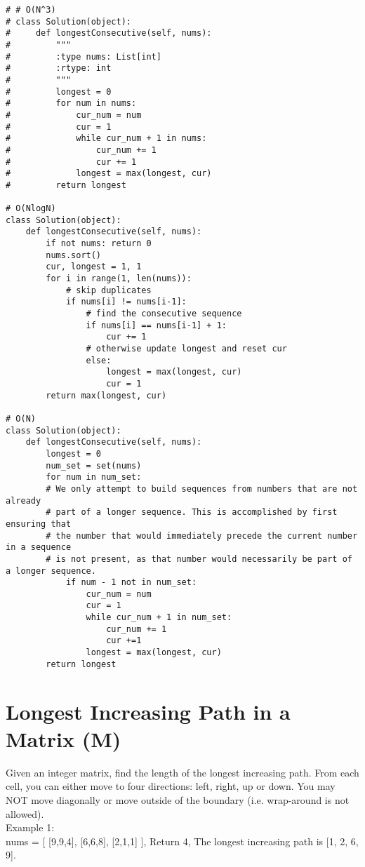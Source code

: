 \begin{lstlisting}
# # O(N^3)
# class Solution(object):
#     def longestConsecutive(self, nums):
#         """
#         :type nums: List[int]
#         :rtype: int
#         """
#         longest = 0
#         for num in nums:
#             cur_num = num
#             cur = 1
#             while cur_num + 1 in nums:
#                 cur_num += 1
#                 cur += 1
#             longest = max(longest, cur)
#         return longest
    
# O(NlogN)
class Solution(object):
    def longestConsecutive(self, nums):
        if not nums: return 0
        nums.sort()
        cur, longest = 1, 1
        for i in range(1, len(nums)):
            # skip duplicates
            if nums[i] != nums[i-1]:
                # find the consecutive sequence
                if nums[i] == nums[i-1] + 1:
                    cur += 1
                # otherwise update longest and reset cur
                else:
                    longest = max(longest, cur)
                    cur = 1
        return max(longest, cur)
           
# O(N)
class Solution(object):
    def longestConsecutive(self, nums):
        longest = 0
        num_set = set(nums)
        for num in num_set:
        # We only attempt to build sequences from numbers that are not already 
        # part of a longer sequence. This is accomplished by first ensuring that 
        # the number that would immediately precede the current number in a sequence 
        # is not present, as that number would necessarily be part of a longer sequence.
            if num - 1 not in num_set:
                cur_num = num
                cur = 1
                while cur_num + 1 in num_set:
                    cur_num += 1
                    cur +=1
                longest = max(longest, cur)
        return longest
\end{lstlisting}
        

\section{Longest Increasing Path in a Matrix (M)}
Given an integer matrix, find the length of the longest increasing path. From each cell, you can either move to four directions: left, right, up or down. You may NOT move diagonally or move outside of the boundary (i.e. wrap-around is not allowed).\\

Example 1:\\
nums = [
  [9,9,4],
  [6,6,8],
  [2,1,1]
],
Return 4,
The longest increasing path is [1, 2, 6, 9].\\

